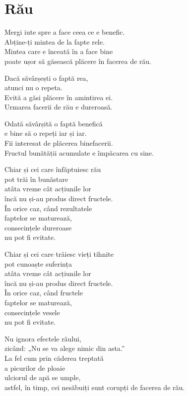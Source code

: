 \chapter{Rău}


Mergi iute spre a face ceea ce e benefic.\\
Abține-ți mintea de la fapte rele.\\
Mintea care e înceată în a face bine\\
poate ușor să găsească plăcere în facerea de rău.


Dacă săvârșești o faptă rea,\\
atunci nu o repeta.\\
Evită a găsi plăcere în amintirea ei.\\
Urmarea facerii de rău e dureroasă.


Odată săvârșită o faptă benefică\\
e bine să o repeți iar și iar.\\
Fii interesat de plăcerea binefacerii.\\
Fructul bunătății acumulate e împăcarea cu sine.


Chiar și cei care înfăptuiesc rău\\
pot trăi în bunăstare\\
atâta vreme cât acțiunile lor\\
încă nu și-au produs direct fructele.\\
În orice caz, când rezultatele\\
faptelor se maturează,\\
consecințele dureroase\\
nu pot fi evitate.


Chiar și cei care trăiesc vieți tihnite\\
pot cunoaște suferința\\
atâta vreme cât acțiunile lor\\
încă nu și-au produs direct fructele.\\
În orice caz, când fructele\\
faptelor se maturează,\\
consecințele vesele\\
nu pot fi evitate.


Nu ignora efectele răului,\\
zicând: „Nu se va alege nimic din asta.”\\
La fel cum prin căderea treptată\\
a picurilor de ploaie\\
ulciorul de apă se umple,\\
astfel, în timp, cei nesăbuiți sunt corupți de facerea de rău.


